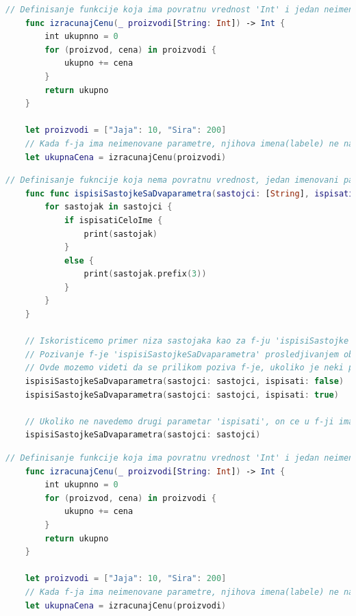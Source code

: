 \documentclass[12pt,oneside]{memoir}
\begin{document}
\begin{lstlisting}[caption=\textit{{Дефинисање и позивање функције са повратном вредношћу}}, label={lst:Дефинисање и позивање функције са повратном вредношћу}, language=Swift, frame=single]    
    // Definisanje funkcije koja ima povratnu vrednost 'Int' i jedan neimenovani parametar
    func izracunajCenu(_ proizvodi[String: Int]) -> Int {
        int ukupnno = 0
        for (proizvod, cena) in proizvodi {
            ukupno += cena
        }
        return ukupno
    }
    
    let proizvodi = ["Jaja": 10, "Sira": 200]
    // Kada f-ja ima neimenovane parametre, njihova imena(labele) ne navodimo prilikom pozivanja te funkcije
    let ukupnaCena = izracunajCenu(proizvodi)
\end{lstlisting}
    
\begin{lstlisting}[caption=\textit{{Дефинисање и позивање функције са параметрима са подразумеваним вредностима}}, label={lst:Дефинисање и позивање функције са параметрима са подразумеваним вредностима}, language=Swift, frame=single]
    // Definisanje fukncije koja nema povratnu vrednost, jedan imenovani parametar i jedan imenovani parametar (cija se labela razlikuje od imena promenljive) sa podrazumevanom vrednoscu
    func func ispisiSastojkeSaDvaparametra(sastojci: [String], ispisati ispisatiCeloIme: Bool = true) {
        for sastojak in sastojci {
            if ispisatiCeloIme {
                print(sastojak)
            }
            else {
                print(sastojak.prefix(3))
            }
        }
    }
    
    // Iskoristicemo primer niza sastojaka kao za f-ju 'ispisiSastojke'
    // Pozivanje f-je 'ispisiSastojkeSaDvaparametra' prosledjivanjem oba paremetra
    // Ovde mozemo videti da se prilikom poziva f-je, ukoliko je neki parametar imenovan, navodi njegova labela
    ispisiSastojkeSaDvaparametra(sastojci: sastojci, ispisati: false)
    ispisiSastojkeSaDvaparametra(sastojci: sastojci, ispisati: true)
    
    // Ukoliko ne navedemo drugi parametar 'ispisati', on ce u f-ji imati podrazumevanu vrednost, u ovom slucaju 'true'
    ispisiSastojkeSaDvaparametra(sastojci: sastojci)
\end{lstlisting}
\begin{lstlisting}[caption=\textit{{Дефинисање и позивање функције са повратном вредношћу}}, label={lst:Дефинисање и позивање функције са повратном вредношћу}, language=Swift, frame=single]    
    // Definisanje funkcije koja ima povratnu vrednost 'Int' i jedan neimenovani parametar
    func izracunajCenu(_ proizvodi[String: Int]) -> Int {
        int ukupnno = 0
        for (proizvod, cena) in proizvodi {
            ukupno += cena
        }
        return ukupno
    }
    
    let proizvodi = ["Jaja": 10, "Sira": 200]
    // Kada f-ja ima neimenovane parametre, njihova imena(labele) ne navodimo prilikom pozivanja te funkcije
    let ukupnaCena = izracunajCenu(proizvodi)
    
\end{lstlisting}
\end{document}
